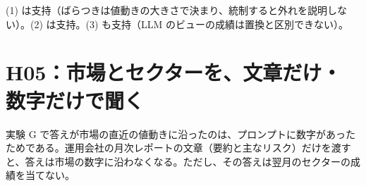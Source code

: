 \documentclass[xelatex,ja=standard,jafont=haranoaji,a4paper,10pt,openany]{bxjsreport}
\begin{document}
\begin{predbox}
(1) は支持（ばらつきは値動きの大きさで決まり、統制すると外れを説明しない）。(2) は支持。(3) も支持（LLM のビューの成績は置換と区別できない）。
\end{predbox}

\chapter{H05：市場とセクターを、文章だけ・数字だけで聞く}\label{ch:h05}

\begin{hypbox}
実験 G で答えが市場の直近の値動きに沿ったのは、プロンプトに数字があったためである。運用会社の月次レポートの文章（要約と主なリスク）だけを渡すと、答えは市場の数字に沿わなくなる。ただし、その答えは翌月のセクターの成績を当てない。
\end{hypbox}
\end{document}

